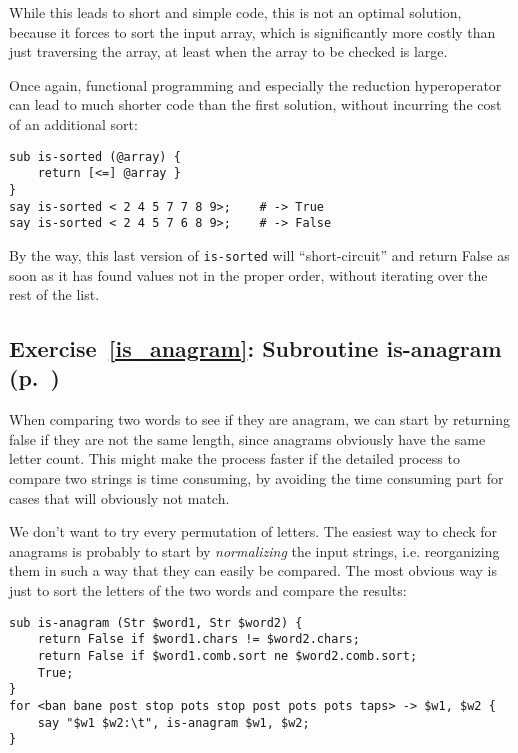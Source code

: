 {While this leads to short and simple code, this is not 
an optimal solution, because it forces to sort the 
input array, which is significantly more costly than 
just traversing the array, at least when the array 
to be checked is large.

Once again, functional programming and especially the 
reduction hyperoperator can lead to much shorter code 
than the first solution, without incurring the cost 
of an additional sort:

\begin{verbatim}
sub is-sorted (@array) {
    return [<=] @array }
}
say is-sorted < 2 4 5 7 7 8 9>;    # -> True
say is-sorted < 2 4 5 7 6 8 9>;    # -> False
\end{verbatim}

By the way, this last version of {\tt is-sorted} will 
``short-circuit'' and return False as soon as it has 
found values not in the proper order, without iterating 
over the rest of the list.

\subsection{Exercise~\ref{is_anagram}: Subroutine is-anagram (p.~\pageref{is_anagram})}
\label{sol_is_anagram}

When comparing two words to see if they are anagram, we 
can start by returning false if they are not the same 
length, since anagrams obviously have the same letter 
count. This might make the process faster if the detailed 
process to compare two strings is time consuming, by 
avoiding the time consuming part for cases that will 
obviously not match.

We don't want to try every permutation of letters. The 
easiest way to check for anagrams is probably to start 
by \emph{normalizing} the input strings, i.e. 
reorganizing them in such a way that they can easily 
be compared. The most obvious way is just to sort the 
letters of the two words and compare the results:

\begin{verbatim}
sub is-anagram (Str $word1, Str $word2) {
    return False if $word1.chars != $word2.chars;
    return False if $word1.comb.sort ne $word2.comb.sort;
    True;
}
for <ban bane post stop pots stop post pots pots taps> -> $w1, $w2 {
    say "$w1 $w2:\t", is-anagram $w1, $w2;
}
\end{verbatim}

}
